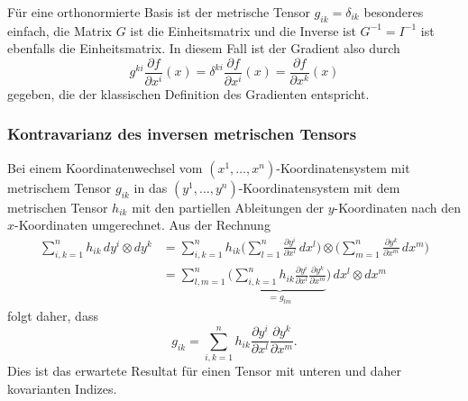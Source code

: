 Für eine orthonormierte Basis ist der metrische Tensor $g_{ik}=\delta_{ik}$
besonderes einfach, die Matrix $G$ ist die Einheitsmatrix und die 
Inverse ist $G^{-1}=I^{-1}$ ist ebenfalls die Einheitsmatrix.
In diesem Fall ist der Gradient also durch
\[
g^{ki}\frac{\partial f}{\partial x^i}(x)
=
\delta^{ki}\frac{\partial f}{\partial x^i}(x)
=
\frac{\partial f}{\partial x^k}(x)
\]
gegeben, die der klassischen Definition des Gradienten entspricht.

%
%
\subsubsection{Kontravarianz des inversen metrischen Tensors}
Bei einem Koordinatenwechsel vom $(x^1,\dots,x^n)$-Koordinatensystem
mit metrischem Tensor $g_{ik}$ in das $(y^1,\dots,y^n)$-Koordinatensystem
mit dem metrischen Tensor $h_{ik}$ mit den partiellen Ableitungen
der $y$-Koordinaten nach den $x$-Koordinaten umgerechnet.
Aus der Rechnung
\begin{align*}
\sum_{i,k=1}^n
h_{ik} \, dy^i \otimes dy^k
&=
\sum_{i,k=1}^n
h_{ik}
\biggl(\sum_{l=1}^n \frac{\partial y^i}{\partial x^l}\, dx^l \biggr)
\otimes
\biggl(\sum_{m=1}^n \frac{\partial y^k}{\partial x^m}\, dx^m \biggr)
\\
&=
\sum_{l,m=1}^n
\biggl(
\underbrace{
\sum_{i,k=1}^n h_{ik}
\frac{\partial y^i}{\partial x^l}
\frac{\partial y^k}{\partial x^m}
}_{\displaystyle = g_{lm}}
\biggr)
\,
dx^l\otimes dx^m
\end{align*}
folgt daher, dass
\begin{equation}
g_{ik}
=
\sum_{i,k=1}^n h_{ik}
\frac{\partial y^i}{\partial x^l}
\frac{\partial y^k}{\partial x^m}.
\label{buch:kurvenintegral:differential:eqn:gkovarianz}
\end{equation}
Dies ist das erwartete Resultat für einen Tensor mit unteren und daher
kovarianten Indizes.

